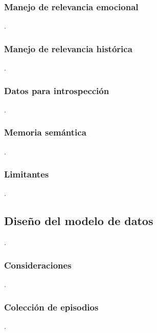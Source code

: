 \subsubsection{Manejo de relevancia emocional}
 .

\subsubsection{Manejo de relevancia histórica}
 .

\subsubsection{Datos para introspección}
 .

\subsubsection{Memoria semántica}
 .

\subsubsection{Limitantes}
 .


\subsection{Diseño del modelo de datos}
 .

\subsubsection{Consideraciones}
 .

\subsubsection{Colección de episodios}
 .


